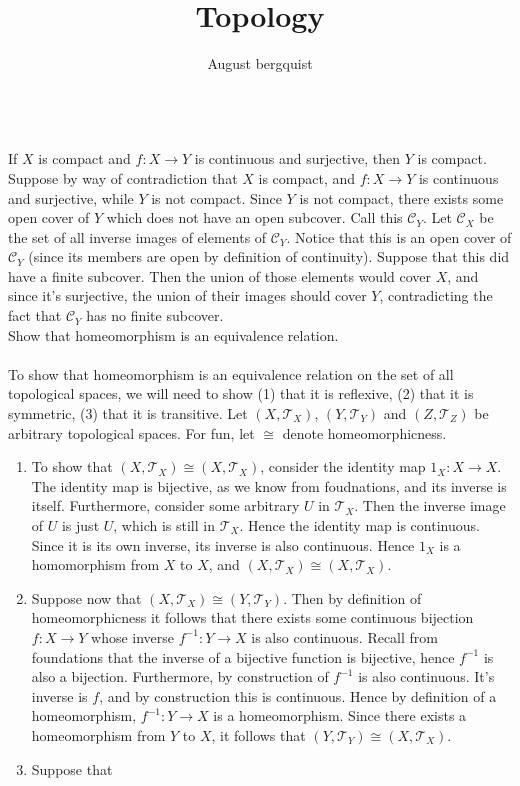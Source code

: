\documentclass{article}
\title{Topology}
\author{August bergquist}
\newcommand{\inv}[1]{#1^{-1}}
\newcommand{\topT}{\mathcal{T}}
\newcommand{\inv}[1]{#1^{-1}}
\newcommand{\topT}{\mathcal{T}}
\begin{document}
\maketitle
{}\\
 If $X$ is compact and $f:X\rightarrow Y$ is continuous and surjective, then $Y$ is compact.\\

 Suppose by way of contradiction that $X$ is compact, and $f:X\rightarrow Y$ is continuous and surjective, while $Y$ is not compact. Since $Y$ is not compact, there exists some open cover of $Y$ which does not have an open subcover. Call this $\mathcal{C}_Y$. Let $\mathcal{C}_X$ be the set of all inverse images of elements of $\mathcal{C}_Y$. Notice that this is an open cover of $\mathcal{C}_Y$ (since its members are open by definition of continuity). Suppose that this did have a finite subcover. Then the union of those elements would cover $X$, and since it's surjective, the union of their images should cover $Y$, contradicting the fact that $\mathcal{C}_Y$ has no finite subcover.\\

 Show that homeomorphism is an equivalence relation.\\

\\

 To show that homeomorphism is an equivalence relation on the set of all topological spaces, we will need to show (1) that it is reflexive, (2) that it is symmetric, (3) that it is transitive. Let $(X,\topT_X)$, $(Y, \topT_Y)$ and $(Z,\topT_Z)$ be arbitrary topological spaces. For fun, let $\cong$ denote homeomorphicness.
\begin{enumerate}
    \item To show that $(X,\topT_X)\cong (X,\topT_X)$, consider the identity map $1_X:X\rightarrow X$. The identity map is bijective, as we know from foudnations, and its inverse is itself. Furthermore, consider some arbitrary $U$ in $\topT_X$. Then the inverse image of $U$ is just $U$, which is still in $\topT_X$. Hence the identity map is continuous. Since it is its own inverse, its inverse is also continuous. Hence $1_X$ is a homomorphism from $X$ to $X$, and $(X,\topT_X)\cong (X,\topT_X)$.
    \item Suppose now that $(X,\topT_X)\cong (Y,\topT_Y)$. Then by definition of homeomorphicness it follows that there exists some continuous bijection $f:X\rightarrow Y$ whose inverse $\inv{f}:Y\rightarrow X$ is also continuous. Recall from foundations that the inverse of a bijective function is bijective, hence $\inv{f}$ is also a bijection. Furthermore, by construction of $\inv{f}$ is also continuous. It's inverse is $f$, and by construction this is continuous. Hence by definition of a homeomorphism, $\inv{f}:Y\rightarrow X$ is a homeomorphism. Since there exists a homeomorphism from $Y$ to $X$, it follows that $(Y,\topT_Y)\cong(X,\topT_X)$.
    \item Suppose that 
\end{enumerate}
\end{document}
